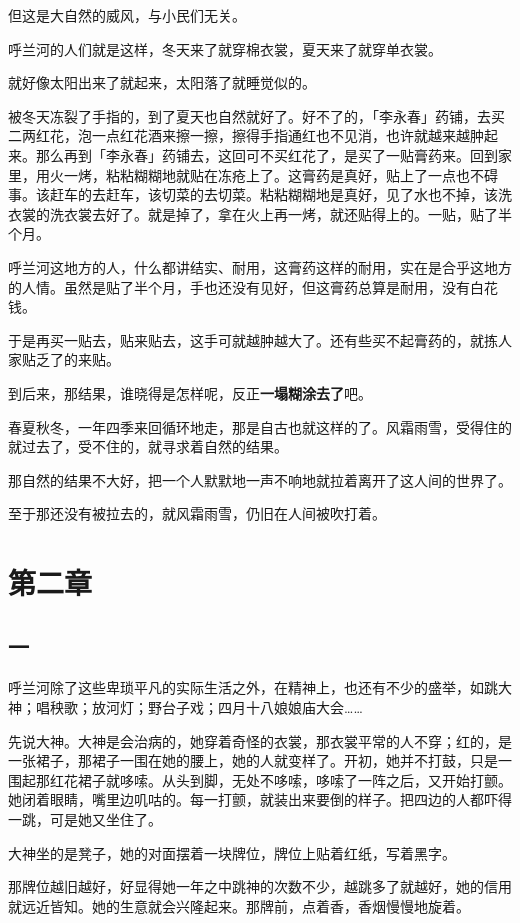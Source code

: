 \documentclass[UTF8]{ctexart}
\begin{document}
但这是大自然的威风，与小民们无关。

呼兰河的人们就是这样，冬天来了就穿棉衣裳，夏天来了就穿单衣裳。

就好像太阳出来了就起来，太阳落了就睡觉似的。

被冬天冻裂了手指的，到了夏天也自然就好了。好不了的，「李永春」药铺，去买二两红花，泡一点红花酒来擦一擦，擦得手指通红也不见消，也许就越来越肿起来。那么再到「李永春」药铺去，这回可不买红花了，是买了一贴膏药来。回到家里，用火一烤，粘粘糊糊地就贴在冻疮上了。这膏药是真好，贴上了一点也不碍事。该赶车的去赶车，该切菜的去切菜。粘粘糊糊地是真好，见了水也不掉，该洗衣裳的洗衣裳去好了。就是掉了，拿在火上再一烤，就还贴得上的。一贴，贴了半个月。

呼兰河这地方的人，什么都讲结实、耐用，这膏药这样的耐用，实在是合乎这地方的人情。虽然是贴了半个月，手也还没有见好，但这膏药总算是耐用，没有白花钱。

于是再买一贴去，贴来贴去，这手可就越肿越大了。还有些买不起膏药的，就拣人家贴乏了的来贴。

到后来，那结果，谁晓得是怎样呢，反正\textbf{一塌糊涂去了}吧。

春夏秋冬，一年四季来回循环地走，那是自古也就这样的了。风霜雨雪，受得住的就过去了，受不住的，就寻求着自然的结果。

那自然的结果不大好，把一个人默默地一声不响地就拉着离开了这人间的世界了。

至于那还没有被拉去的，就风霜雨雪，仍旧在人间被吹打着。

\section{第二章}

\subsection{一}

呼兰河除了这些卑琐平凡的实际生活之外，在精神上，也还有不少的盛举，如跳大神；唱秧歌；放河灯；野台子戏；四月十八娘娘庙大会……

先说大神。大神是会治病的，她穿着奇怪的衣裳，那衣裳平常的人不穿；红的，是一张裙子，那裙子一围在她的腰上，她的人就变样了。开初，她并不打鼓，只是一围起那红花裙子就哆嗦。从头到脚，无处不哆嗦，哆嗦了一阵之后，又开始打颤。她闭着眼睛，嘴里边叽咕的。每一打颤，就装出来要倒的样子。把四边的人都吓得一跳，可是她又坐住了。

大神坐的是凳子，她的对面摆着一块牌位，牌位上贴着红纸，写着黑字。

那牌位越旧越好，好显得她一年之中跳神的次数不少，越跳多了就越好，她的信用就远近皆知。她的生意就会兴隆起来。那牌前，点着香，香烟慢慢地旋着。
\end{document}
